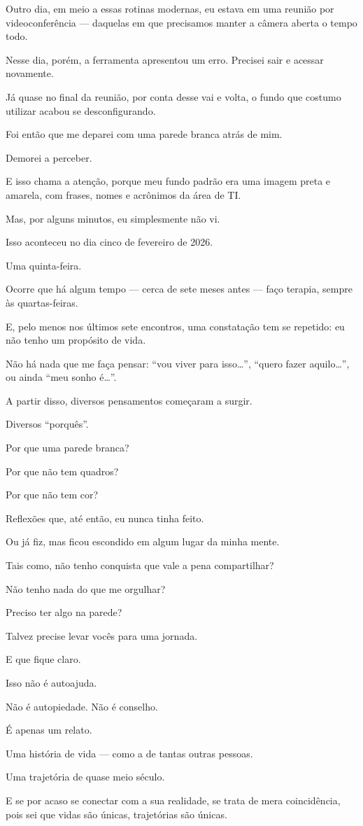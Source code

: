 Outro dia, em meio a essas rotinas modernas, eu estava em uma reunião por videoconferência — daquelas em que precisamos manter a câmera aberta o tempo todo.

Nesse dia, porém, a ferramenta apresentou um erro. Precisei sair e acessar novamente. 

Já quase no final da reunião, por conta desse vai e volta, o fundo que costumo utilizar acabou se desconfigurando.

Foi então que me deparei com uma parede branca atrás de mim.

Demorei a perceber.

E isso chama a atenção, porque meu fundo padrão era uma imagem preta e amarela, com frases, nomes e acrônimos da área de TI.

Mas, por alguns minutos, eu simplesmente não vi.

Isso aconteceu no dia cinco de fevereiro de 2026. 

Uma quinta-feira.

Ocorre que há algum tempo — cerca de sete meses antes — faço terapia, sempre às quartas-feiras. 

E, pelo menos nos últimos sete encontros, uma constatação tem se repetido: eu não tenho um propósito de vida.

Não há nada que me faça pensar: “vou viver para isso…”, “quero fazer aquilo…”, ou ainda “meu sonho é…”.

A partir disso, diversos pensamentos começaram a surgir.

Diversos “porquês”.

Por que uma parede branca? 

Por que não tem quadros? 

Por que não tem cor?

Reflexões que, até então, eu nunca tinha feito.

Ou já fiz, mas ficou escondido em algum lugar da minha mente.

Tais como, não tenho conquista que vale a pena compartilhar? 

Não tenho nada do que me orgulhar? 

Preciso ter algo na parede?

Talvez precise levar vocês para uma jornada.

E que fique claro. 

Isso não é autoajuda. 

Não é autopiedade. Não é conselho.

É apenas um relato.

Uma história de vida — como a de tantas outras pessoas.

Uma trajetória de quase meio século.

E se por acaso se conectar com a sua realidade, se trata de mera coincidência, pois sei que vidas são únicas, trajetórias são únicas. 

